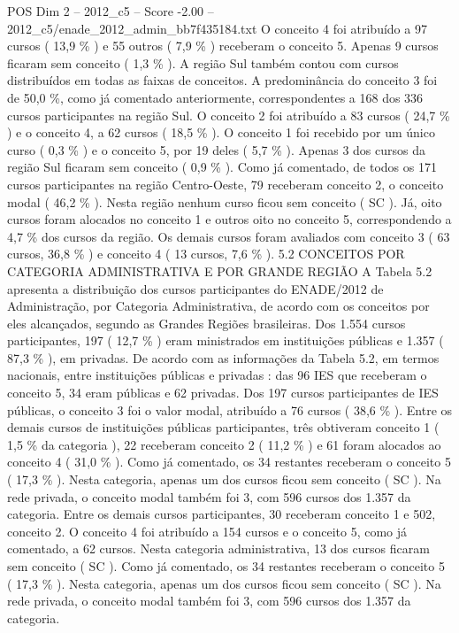 \begin{textsample}{POS Dim 2 – 2012\_c5 – Score -2.00 – 2012\_c5/enade\_2012\_admin\_bb7f435184.txt}
O conceito 4 foi atribuído a 97 cursos ( 13,9 \% ) e 55 outros ( 7,9 \% ) receberam o conceito 5.
Apenas 9 cursos ficaram sem conceito ( 1,3 \% ).
A região Sul também contou com cursos distribuídos em todas as faixas de conceitos.
A predominância do conceito 3 foi de 50,0 \%, como já comentado anteriormente, correspondentes a 168 dos 336 cursos participantes na região Sul.
O conceito 2 foi atribuído a 83 cursos ( 24,7 \% ) e o conceito 4, a 62 cursos ( 18,5 \% ).
O conceito 1 foi recebido por um único curso ( 0,3 \% ) e o conceito 5, por 19 deles ( 5,7 \% ).
Apenas 3 dos cursos da região Sul ficaram sem conceito ( 0,9 \% ).
Como já comentado, de todos os 171 cursos participantes na região Centro-Oeste, 79 receberam conceito 2, o conceito modal ( 46,2 \% ).
Nesta região nenhum curso ficou sem conceito ( SC ).
Já, oito cursos foram alocados no conceito 1 e outros oito no conceito 5, correspondendo a 4,7 \% dos cursos da região.
Os demais cursos foram avaliados com conceito 3 ( 63 cursos, 36,8 \% ) e conceito 4 ( 13 cursos, 7,6 \% ). 5.2 CONCEITOS POR CATEGORIA ADMINISTRATIVA E POR GRANDE REGIÃO A Tabela 5.2 apresenta a distribuição dos cursos participantes do ENADE/2012 de Administração, por Categoria Administrativa, de acordo com os conceitos por eles alcançados, segundo as Grandes Regiões brasileiras.
Dos 1.554 cursos participantes, 197 ( 12,7 \% ) eram ministrados em instituições públicas e 1.357 ( 87,3 \% ), em privadas.
De acordo com as informações da Tabela 5.2, em termos nacionais, entre instituições públicas e privadas : das 96 IES que receberam o conceito 5, 34 eram públicas e 62 privadas.
Dos 197 cursos participantes de IES públicas, o conceito 3 foi o valor modal, atribuído a 76 cursos ( 38,6 \% ).
Entre os demais cursos de instituições públicas participantes, três obtiveram conceito 1 ( 1,5 \% da categoria ), 22 receberam conceito 2 ( 11,2 \% ) e 61 foram alocados ao conceito 4 ( 31,0 \% ).
Como já comentado, os 34 restantes receberam o conceito 5 ( 17,3 \% ).
Nesta categoria, apenas um dos cursos ficou sem conceito ( SC ).
Na rede privada, o conceito modal também foi 3, com 596 cursos dos 1.357 da categoria.
Entre os demais cursos participantes, 30 receberam conceito 1 e 502, conceito 2.
O conceito 4 foi atribuído a 154 cursos e o conceito 5, como já comentado, a 62 cursos.
Nesta categoria administrativa, 13 dos cursos ficaram sem conceito ( SC ).
Como já comentado, os 34 restantes receberam o conceito 5 ( 17,3 \% ).
Nesta categoria, apenas um dos cursos ficou sem conceito ( SC ).
Na rede privada, o conceito modal também foi 3, com 596 cursos dos 1.357 da categoria.

\end{textsample}
